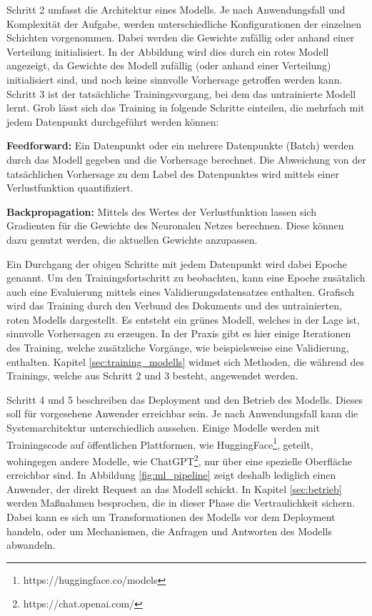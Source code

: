 Schritt 2 umfasst die Architektur eines Modells.
Je nach Anwendungsfall und Komplexität der Aufgabe, werden unterschiedliche Konfigurationen der einzelnen Schichten vorgenommen.
Dabei werden die Gewichte zufällig oder anhand einer Verteilung initialisiert.
In der Abbildung wird dies durch ein rotes Modell angezeigt, da Gewichte des Modell zufällig (oder anhand einer Verteilung) initialisiert sind, und noch keine sinnvolle Vorhersage getroffen werden kann.
Schritt 3 ist der tatsächliche Trainingsvorgang, bei dem das untrainierte Modell lernt.
Grob lässt sich das Training in folgende Schritte einteilen, die mehrfach mit jedem Datenpunkt durchgeführt werden können:
\begin{compactenum}
\item \textbf{Feedforward: }Ein Datenpunkt oder ein mehrere Datenpunkte (Batch) werden durch das Modell gegeben und die Vorhersage berechnet. Die Abweichung von der tatsächlichen Vorhersage zu dem Label des Datenpunktes wird mittels einer Verlustfunktion quantifiziert.
\item \textbf{Backpropagation: }Mittels des Wertes der Verlustfunktion lassen sich Gradienten für die Gewichte des Neuronalen Netzes berechnen. Diese können dazu genutzt werden, die aktuellen Gewichte anzupassen. 
\end{compactenum}
Ein Durchgang der obigen Schritte mit jedem Datenpunkt wird dabei Epoche genannt. 
Um den Trainingsfortschritt zu beobachten, kann eine Epoche zusätzlich auch eine Evaluierung mittels eines Validierungsdatensatzes enthalten.
Grafisch wird das Training durch den Verbund des Dokuments und des untrainierten, roten Modells dargestellt. 
Es entsteht ein grünes Modell, welches in der Lage ist, sinnvolle Vorhersagen zu erzeugen.
In der Praxis gibt es hier einige Iterationen des Training, welche zusätzliche Vorgänge, wie beispielsweise eine Validierung, enthalten. 
Kapitel \ref{sec:training_modells} widmet sich Methoden, die während des Trainings, welche aus Schritt 2 und 3 besteht, angewendet werden.

Schritt 4 und 5 beschreiben das Deployment und den Betrieb des Modells. 
Dieses soll für vorgesehene Anwender erreichbar sein. 
Je nach Anwendungsfall kann die Systemarchitektur unterschiedlich aussehen. 
Einige Modelle werden mit Trainingscode auf öffentlichen Plattformen, wie HuggingFace\footnote{https://huggingface.co/models}, geteilt, wohingegen andere Modelle, wie ChatGPT\footnote{https://chat.openai.com/}, nur über eine spezielle Oberfläche erreichbar sind.
In Abbildung \ref{fig:ml_pipeline} zeigt deshalb lediglich einen Anwender, der direkt Request an das Modell schickt.
In Kapitel \ref{sec:betrieb} werden Maßnahmen besprochen, die in dieser Phase die Vertraulichkeit sichern. 
Dabei kann es sich um Transformationen des Modells vor dem Deployment handeln, oder um Mechanismen, die Anfragen und Antworten des Modells abwandeln.